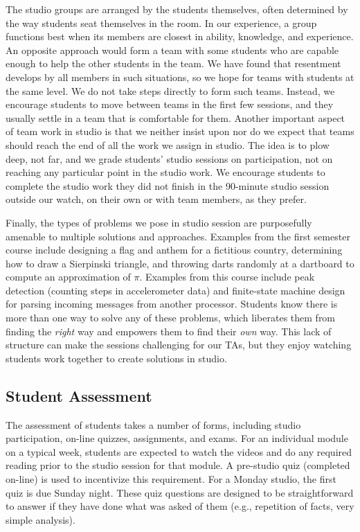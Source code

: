 The studio groups are arranged by the students themselves, often determined
by the way students seat themselves in the room. In our experience, a group
functions best when its members are closest in ability, knowledge, and
experience.  An opposite approach would form a team with some students who
are capable enough to help the other students in the team.  We have found
that resentment develops by all members in such situations, so we hope for
teams with students at the same level.   We do not take steps directly to
form such teams.  Instead, we encourage students to move between teams in
the first few sessions, and they usually settle in a team that is comfortable
for them.  Another important aspect of team work in studio is that we neither
insist upon nor do we expect that teams should reach the end of all the work
we assign in studio.  The idea is to plow deep, not far, and we grade
students' studio sessions on participation,
not on reaching any particular point in the
studio work.  We encourage students to complete the studio work they did not
finish in the 90-minute studio session outside our watch,
on their own or with team members,
as they prefer.

Finally, the types of problems we pose in studio session are purposefully
amenable to multiple solutions and approaches.  Examples from the
first semester course include designing
a flag and anthem for a fictitious country, determining how to draw a Sierpinski
triangle, and throwing darts randomly at a dartboard to compute an approximation
of $\pi$.
Examples from this course include peak detection (counting steps in
accelerometer data) and finite-state machine design for parsing
incoming messages from another processor.
Students know there is more than one way to solve any of these
problems, which liberates them from finding the \emph{right} way and
empowers them to find their \emph{own} way.  This lack of structure can make
the sessions challenging for our TAs, but they enjoy watching students work
together to create solutions in studio.

\subsection{Student Assessment}

The assessment of students takes a number of forms, including studio
participation, on-line quizzes, assignments, and exams.
For an individual module on a typical week,
students are expected to watch the videos
and do any required reading prior to the studio session for that module.
A pre-studio quiz (completed on-line) is used to incentivize this
requirement.  For a Monday studio, the first quiz is due Sunday night.
These quiz questions are designed to be straightforward to answer if
they have done what was asked of them (e.g., repetition of facts,
very simple analysis).

